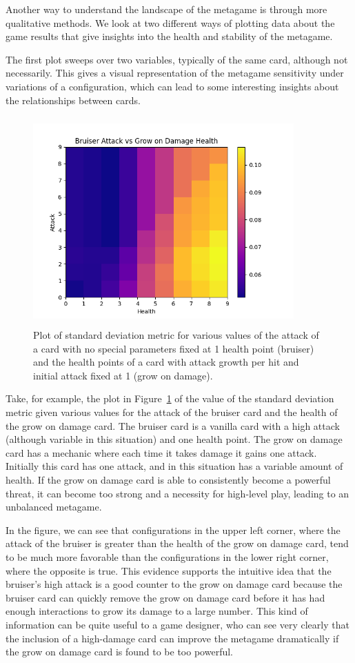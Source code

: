 Another way to understand the landscape of the metagame is through more qualitative methods. We look at two different ways of plotting data about the game results that give insights into the health and stability of the metagame. 

The first plot sweeps over two variables, typically of the same card, although not necessarily. This gives a visual representation of the metagame sensitivity under variations of a configuration, which can lead to some interesting insights about the relationships between cards.

\begin{figure}[t]
	\includegraphics[width=10cm, height=8cm]{bruiser_vs_grow} 
	\caption{Plot of standard deviation metric for various values of the attack of a card with no special parameters fixed at 1 health point (bruiser) and the health points of a card with attack growth per hit and initial attack fixed at 1 (grow on damage).}
	\label{fig:bruiser_vs_grow}
\end{figure}

Take, for example, the plot in Figure~\ref{fig:bruiser_vs_grow} of the value of the standard deviation metric given various values for the attack of the bruiser card and the health of the grow on damage card. The bruiser card is a vanilla card with a high attack (although variable in this situation) and one health point. The grow on damage card has a mechanic where each time it takes damage it gains one attack. Initially this card has one attack, and in this situation has a variable amount of health. If the grow on damage card is able to consistently become a powerful threat, it can become too strong and a necessity for high-level play, leading to an unbalanced metagame.

In the figure, we can see that configurations in the upper left corner, where the attack of the bruiser is greater than the health of the grow on damage card, tend to be much more favorable than the configurations in the lower right corner, where the opposite is true. This evidence supports the intuitive idea that the bruiser's high attack is a good counter to the grow on damage card because the bruiser card can quickly remove the grow on damage card before it has had enough interactions to grow its damage to a large number. This kind of information can be quite useful to a game designer, who can see very clearly that the inclusion of a high-damage card can improve the metagame dramatically if the grow on damage card is found to be too powerful.

